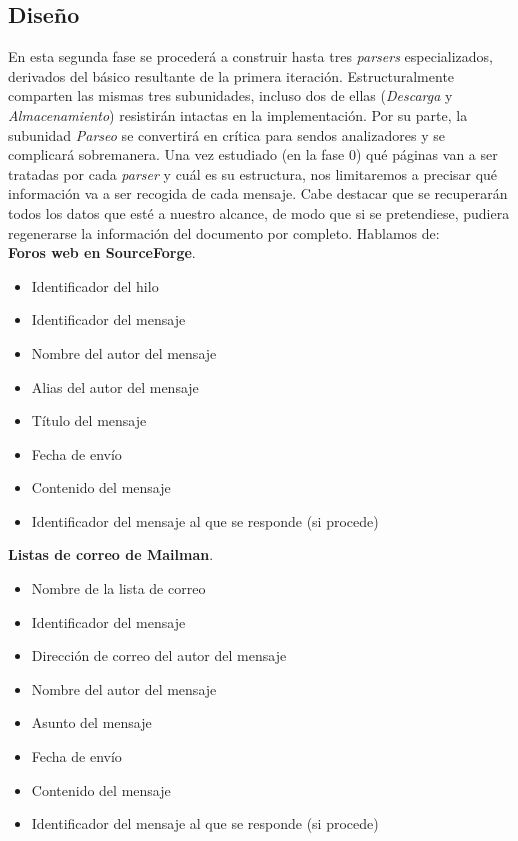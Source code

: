 \subsection{Diseño}
En esta segunda fase se procederá a construir hasta tres \textit{parsers}
especializados, derivados del básico resultante de la primera iteración.
Estructuralmente comparten las mismas tres subunidades, incluso dos de ellas
(\textit{Descarga} y \textit{Almacenamiento}) resistirán intactas en la
implementación. Por su parte, la subunidad \textit{Parseo} se convertirá
en crítica para sendos analizadores y se complicará sobremanera.
Una vez estudiado (en la fase 0) qué páginas van a ser tratadas por cada
\textit{parser} y cuál es su estructura, nos limitaremos a precisar qué
información va a ser recogida de cada mensaje.
Cabe destacar que se recuperarán todos los datos que esté a nuestro alcance,
de modo que si se pretendiese, pudiera regenerarse la información del
documento por completo.
Hablamos de:\\

\noindent \textbf{Foros web en SourceForge}.
\begin{itemize} \itemsep=-0.1cm
\item Identificador del hilo
\item Identificador del mensaje
\item Nombre del autor del mensaje
\item Alias del autor del mensaje
\item Título del mensaje
\item Fecha de envío
\item Contenido del mensaje
\item Identificador del mensaje al que se responde (si procede)
\end{itemize}

\noindent \textbf{Listas de correo de Mailman}.
\begin{itemize} \itemsep=-0.1cm
\item Nombre de la lista de correo
\item Identificador del mensaje
\item Dirección de correo del autor del mensaje
\item Nombre del autor del mensaje
\item Asunto del mensaje
\item Fecha de envío
\item Contenido del mensaje
\item Identificador del mensaje al que se responde (si procede)
\end{itemize}

